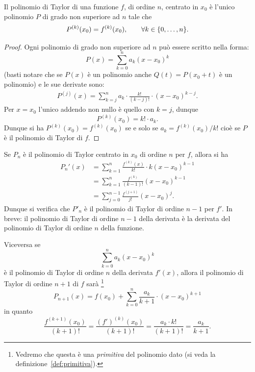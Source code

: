 \begin{theorem}%
\label{th:caratterizzazioneTaylor}%
\mymark{***}%
Il polinomio di Taylor di una funzione $f$, di ordine $n$, centrato in $x_0$ è l'unico polinomio $P$ di grado non superiore ad $n$ tale che
\[
  P^{(k)}(x_0) = f^{(k)}(x_0), \qquad \forall k \in {\left\{ 0,\dots,n \right\}}.
\]
\end{theorem}
%
\begin{proof}

Ogni polinomio di grado non superiore ad $n$ può essere scritto nella forma:
\[
  P(x) = \sum_{k=0}^{n} a_k (x-x_0)^k
\]
(basti notare che se $P(x)$ è un polinomio anche $Q(t) = P(x_0+t)$ è
un polinomio)
e le sue derivate sono:
\begin{align*}
   P^{(j)}(x)
   = \sum_{k=j}^n a_k \cdot \frac{k!}{(k-j)!}\cdot (x-x_0)^{k-j}.
\end{align*}
Per $x=x_0$ l'unico addendo non nullo è quello con $k=j$, dunque
\[
  P^{(k)}(x_0) = k! \cdot a_k.
\]
Dunque si ha $P^{(k)}(x_0) = f^{(k)}(x_0)$ se e solo se $a_k = f^{(k)}(x_0)/k!$ cioè se $P$ è il polinomio di Taylor di $f$.
\end{proof}

\begin{remark}
Se $P_n$ è il polinomio di Taylor centrato in $x_0$ di ordine $n$ per $f$, allora
si ha
\begin{align*}
P_n'(x) &= \sum_{k=1}^{n} \frac{f^{(k)}(x)}{k!}\cdot k(x-x_0)^{k-1} \\
  &= \sum_{k=1}^{n} \frac{f^{(k)}}{(k-1)!} (x-x_0)^{k-1} \\
  &= \sum_{j=0}^{n-1} \frac{f^{(j+1)}}{j!} (x-x_0)^j.
\end{align*}
Dunque si verifica che $P'_n$ è il polinomio di Taylor di ordine $n-1$ per $f'$.
In breve: il polinomio di Taylor di ordine $n-1$ della derivata è la derivata
del polinomio di Taylor di ordine $n$ della funzione.

Viceversa se
\[
   \sum_{k=0}^n a_k (x-x_0)^k
\]
è il polinomio di Taylor di ordine $n$ della derivata $f'(x)$, allora
il polinomio di Taylor di ordine $n+1$ di $f$ sarà%
\footnote{Vedremo che questa è una \emph{primitiva} del polinomio dato (si veda la
definizione~\ref{def:primitiva}).}
\begin{equation}\label{eq:4993725}
  P_{n+1}(x) = f(x_0) + \sum_{k=0}^{n} \frac{a_{k}}{k+1}\cdot (x-x_0)^{k+1}
\end{equation}
in quanto
\[
  \frac{f^{(k+1)}(x_0)}{(k+1)!}
  =\frac{(f')^{(k)}(x_0)}{(k+1)!}
  = \frac{a_k \cdot k!}{ (k+1)!}
  = \frac{a_k}{k+1}.
\]
\end{remark}

